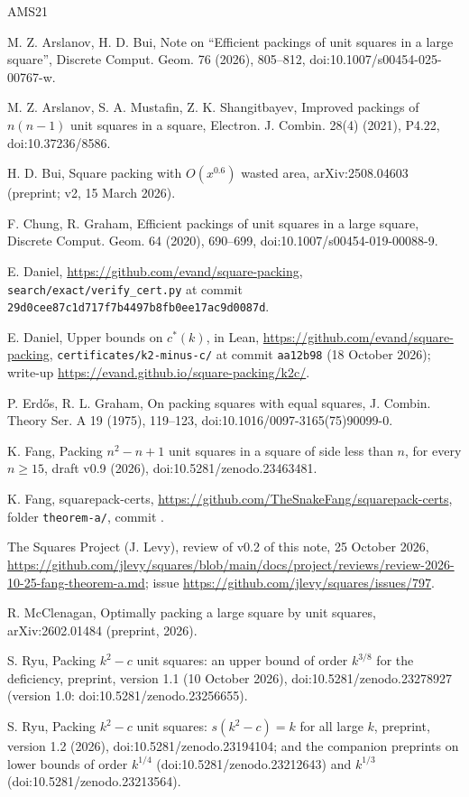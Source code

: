 \documentclass[11pt,letterpaper]{amsart}
\theoremstyle{plain}
\theoremstyle{remark}
\newcommand{\cs}{c^{*}}
\begin{document}
\begin{thebibliography}{AMS21}

 M. Z. Arslanov, H. D. Bui, Note on ``Efficient packings of unit squares in a large square'', Discrete Comput. Geom. 76 (2026), 805--812, doi:10.1007/s00454-025-00767-w.

 M. Z. Arslanov, S. A. Mustafin, Z. K. Shangitbayev, Improved packings of $n(n-1)$ unit squares in a square, Electron. J. Combin. 28(4) (2021), P4.22, doi:10.37236/8586.

 H. D. Bui, Square packing with $O(x^{0.6})$ wasted area, arXiv:2508.04603 (preprint; v2, 15 March 2026).

 F. Chung, R. Graham, Efficient packings of unit squares in a large square, Discrete Comput. Geom. 64 (2020), 690--699, doi:10.1007/s00454-019-00088-9.

 E. Daniel, \url{https://github.com/evand/square-packing}, \texttt{search/exact/verify\_cert.py} at commit \texttt{29d0cee87c1d717f7b4497b8fb0ee17ac9d0087d}.

 E. Daniel, Upper bounds on $\cs(k)$, in Lean, \url{https://github.com/evand/square-packing}, \texttt{certificates/k2-minus-c/} at commit \texttt{aa12b98} (18 October 2026); write-up \url{https://evand.github.io/square-packing/k2c/}.

 P. Erd\H{o}s, R. L. Graham, On packing squares with equal squares, J. Combin. Theory Ser. A 19 (1975), 119--123, doi:10.1016/0097-3165(75)90099-0.

 K. Fang, Packing $n^2-n+1$ unit squares in a square of side less than $n$, for every $n\ge15$, draft v0.9 (2026), doi:10.5281/zenodo.23463481.

 K. Fang, squarepack-certs, \url{https://github.com/TheSnakeFang/squarepack-certs}, folder \texttt{theorem-a/}, commit .

 The Squares Project (J. Levy), review of v0.2 of this note, 25 October 2026, \url{https://github.com/jlevy/squares/blob/main/docs/project/reviews/review-2026-10-25-fang-theorem-a.md}; issue \url{https://github.com/jlevy/squares/issues/797}.

 R. McClenagan, Optimally packing a large square by unit squares, arXiv:2602.01484 (preprint, 2026).

 S. Ryu, Packing $k^2-c$ unit squares: an upper bound of order $k^{3/8}$ for the deficiency, preprint, version 1.1 (10 October 2026), doi:10.5281/zenodo.23278927 (version 1.0: doi:10.5281/zenodo.23256655).

 S. Ryu, Packing $k^2-c$ unit squares: $s(k^2-c)=k$ for all large $k$, preprint, version 1.2 (2026), doi:10.5281/zenodo.23194104; and the companion preprints on lower bounds of order $k^{1/4}$ (doi:10.5281/zenodo.23212643) and $k^{1/3}$ (doi:10.5281/zenodo.23213564).

\end{thebibliography}
\end{document}

